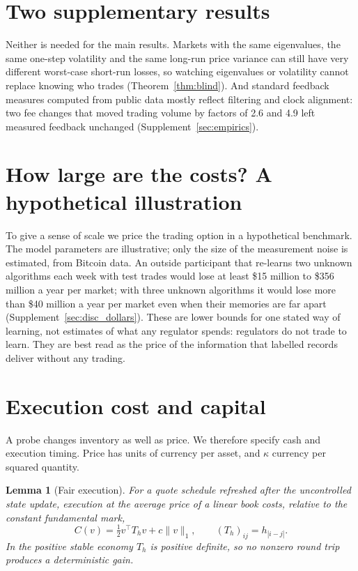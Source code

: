 \documentclass[12pt]{article}
\newtheorem{lemma}[theorem]{Lemma}
\theoremstyle{definition}
\theoremstyle{remark}
\begin{document}
\section{Two supplementary results}\label{app:twosupp} Neither is needed for the main results. Markets with the same eigenvalues, the same one-step volatility and the same long-run price variance can still have very different worst-case short-run losses, so watching eigenvalues or volatility cannot replace knowing who trades (Theorem~\ref{thm:blind}). And standard feedback measures computed from public data mostly reflect filtering and clock alignment: two fee changes that moved trading volume by factors of 2.6 and 4.9 left measured feedback unchanged (Supplement~\ref{sec:empirics}).

\section{How large are the costs? A hypothetical illustration}\label{app:hypocost} To give a sense of scale we price the trading option in a hypothetical benchmark. The model parameters are illustrative; only the size of the measurement noise is estimated, from Bitcoin data. An outside participant that re-learns two unknown algorithms each week with test trades would lose at least \$15 million to \$356 million a year per market; with three unknown algorithms it would lose more than \$40 million a year per market even when their memories are far apart (Supplement~\ref{sec:disc_dollars}). These are lower bounds for one stated way of learning, not estimates of what any regulator spends: regulators do not trade to learn. They are best read as the price of the information that labelled records deliver without any trading.

\section{Execution cost and capital}\label{app:capital}

A probe changes inventory as well as price. We therefore specify cash and execution timing. Price has units of currency per asset, and $\kappa$ currency per squared quantity.

\begin{lemma}[Fair execution]\label{lem:toeplitz}
For a quote schedule refreshed after the uncontrolled state update, execution at the average price of a linear book costs, relative to the constant fundamental mark,
\begin{equation}\label{eq:cost}
C(v)=\tfrac12v^\top T_hv+c\|v\|_1,\qquad (T_h)_{ij}=h_{|i-j|}.
\end{equation}
In the positive stable economy $T_h$ is positive definite, so no nonzero round trip produces a deterministic gain.
\end{lemma}
\end{document}
